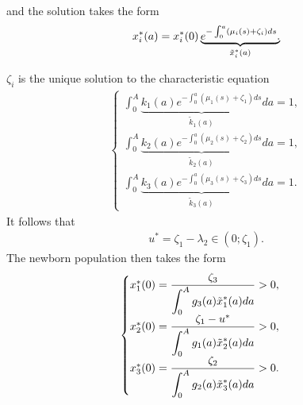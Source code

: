 \documentclass[10pt, a4paper]{amsart}
\theoremstyle{plain}
\theoremstyle{definition}
\theoremstyle{remark}
\numberwithin{equation}{section}
\begin{document}
and  the solution takes the form
\begin{align}\label{e3.3}
x_i^*(a)=x^*_i(0)\underbrace{e^{-\int_0^a(\mu_i(s)+\zeta_i)ds}.}_{\Tilde{x}^*_i(a)}
\end{align}

$\zeta_i$ is the unique solution to the characteristic equation 
\begin{align}\label{e3.4}
\begin{cases}
\displaystyle\int_0^A\underbrace{k_1(a)e^{-\int_0^a(\mu_1(s)+\zeta_1)ds}}_{\tilde{k}_1(a)}da=1,\\
      \displaystyle\int_0^A\underbrace{k_2(a)e^{-\int_0^a(\mu_2(s)+\zeta_2)ds}}_{\tilde{k}_2(a)}da=1,\\
       \displaystyle\int_0^A\underbrace{k_3(a)e^{-\int_0^a(\mu_3(s)+\zeta_3)ds}}_{\tilde{k}_3(a)}da=1.
\end{cases}
\end{align}
It follows  that
\begin{align}\label{e3.5}
    u^*=\zeta_1-\lambda_2\in (0;\zeta_1).
\end{align}
The newborn population then takes the form
\begin{align}\label{e3.6}
 \begin{cases}
x_1^*(0)=\dfrac{\zeta_3}{\displaystyle\int_0^Ag_3(a)\Tilde{x}^*_1(a)da}>0,\\
x_2^*(0)=\dfrac{\zeta_1-u^*}{\displaystyle\int_0^Ag_1(a)\Tilde{x}^*_2(a)da}>0,\\
x_3^*(0)=\dfrac{\zeta_2}{\displaystyle\int_0^Ag_2(a)\Tilde{x}^*_3(a)da}>0.
 \end{cases}
\end{align}
\end{document}
